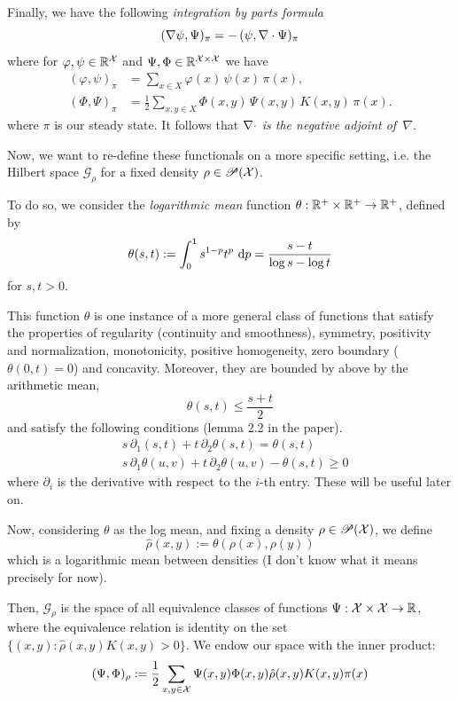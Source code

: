 Finally, we have the following \emph{integration by parts formula} 
\[
(\nabla\psi,\Psi)_\pi= -\,(\psi,\nabla \cdot\Psi)_\pi
\]
where for $\varphi,\psi\in\mathbb{R}^{\mathcal{X}}$ and $\Psi,\Phi\in\mathbb{R}^{\mathcal{X}\times\mathcal{X}}$ we have
\begin{align*}
(\varphi,\psi)_\pi
&= \sum_{x\in X} \varphi(x)\,\psi(x)\,\pi(x), \\
(\Phi,\Psi)_\pi
&= \frac{1}{2}\sum_{x,y\in X}
   \Phi(x,y)\,\Psi(x,y)\,K(x,y)\,\pi(x).
\end{align*}
where $\pi$ is our steady state. It follows that \textit{$\nabla \cdot$ is the negative adjoint of $\,\nabla$}.

Now, we want to re-define these functionals on a more specific setting, i.e. the Hilbert space $\mathcal{G}_\rho$ for a fixed density $\rho \in \mathscr{P}(\mathcal{X})$.

To do so, we consider the \emph{logarithmic mean} function $\theta:\mathbb{R}^+ \times \mathbb{R}^+ \to \mathbb{R}^+$, defined by
\[
\theta(s,t) := \int_0^1s^{1-p}t^p \,\mathop{}\!\mathrm{d} p= \frac{s-t}{\log s-\log t}
\]
for $s,t> 0$. 

This function $\theta$ is one instance of a more general class of functions that satisfy the properties of regularity (continuity and smoothness), symmetry, positivity and normalization, monotonicity, positive homogeneity, zero boundary ($\theta(0,t)=0$) and concavity. Moreover, they are bounded by above by the arithmetic mean,
\begin{equation}\label{eq:arithmmean}
    \theta(s,t) \le \frac{s+t}{2}
\end{equation}
and satisfy the following conditions (lemma 2.2 in the paper).
\begin{align}
    & s\,\partial_1(s,t)+t\,\partial_2\theta(s,t) = \theta(s,t)\\
    & s\,\partial_1\theta(u,v) + t\,\partial_2\theta(u,v) - \theta(s,t)  \ge 0
\end{align}
where $\partial_i$ is the derivative with respect to the $i$-th entry. These will be useful later on. 

Now, considering $\theta$ as the log mean, and fixing a density $\rho \in \mathscr{P}(\mathcal{X})$, we define
\[
\hat \rho(x,y):= \theta(\rho(x),\rho(y))
\]
which is a logarithmic mean between densities (I don't know what it means precisely for now). 

Then, $\mathcal{G}_\rho$ is the space of all equivalence classes of functions $\Psi:\mathcal{X} \times \mathcal{X} \to \mathbb{R}$, where the equivalence relation is identity on the set $\{(x,y):\hat \rho(x,y)K(x,y) >0\}$. We endow our space with the inner product:
\[
(\Psi,\Phi)_\rho := \frac{1}{2}\sum_{x,y\in\mathcal{X}} \Psi(x,y)\Phi(x,y)\hat\rho(x,y)K(x,y)\pi(x)
\]

